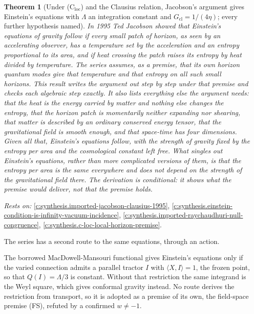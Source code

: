 \documentclass[11pt]{article}
\newtheorem{theorem}{Theorem}[section]
\theoremstyle{definition}
\theoremstyle{plain}
\providecommand{\ip}{}\renewcommand{\ip}[2]{\langle #1, #2\rangle}
\begin{document}
\begin{theorem}[Under (C$_{\mathrm{loc}}$) and the Clausius relation, Jacobson's argument gives Einstein's equations with $\Lambda$ an integration constant and $G_{\mathrm{cl}} = 1/(4\eta)$; every further hypothesis named]\label{c:synthesis.einstein-equations-from-c-loc-and-clausius}
In 1995 Ted Jacobson showed that Einstein's equations of gravity follow if every small patch of horizon, as seen by an accelerating observer, has a temperature set by the acceleration and an entropy proportional to its area, and if heat crossing the patch raises its entropy by heat divided by temperature. The series assumes, as a premise, that its own horizon quantum modes give that temperature and that entropy on all such small horizons. This result writes the argument out step by step under that premise and checks each algebraic step exactly. It also lists everything else the argument needs: that the heat is the energy carried by matter and nothing else changes the entropy, that the horizon patch is momentarily neither expanding nor shearing, that matter is described by an ordinary conserved energy tensor, that the gravitational field is smooth enough, and that space-time has four dimensions. Given all that, Einstein's equations follow, with the strength of gravity fixed by the entropy per area and the cosmological constant left free. What singles out Einstein's equations, rather than more complicated versions of them, is that the entropy per area is the same everywhere and does not depend on the strength of the gravitational field there. The derivation is conditional: it shows what the premise would deliver, not that the premise holds.
\end{theorem}
\noindent\emph{Rests on:} \ref{c:synthesis.imported-jacobson-clausius-1995}, \ref{c:synthesis.einstein-condition-is-infinity-vacuum-incidence}, \ref{c:synthesis.imported-raychaudhuri-null-congruence}, \ref{c:synthesis.c-loc-local-horizon-premise}.

The series has a second route to the same equations, through an action.

The borrowed MacDowell-Mansouri functional gives Einstein's equations only if the varied connection admits a parallel tractor $I$ with $\ip{X}{I} = 1$, the frozen point, so that $Q(I) = \Lambda/3$ is constant. Without that restriction the same integrand is the Weyl square, which gives conformal gravity instead. No route derives the restriction from transport, so it is adopted as a premise of its own, the field-space premise (FS), refuted by a confirmed $w \neq -1$.
\end{document}
